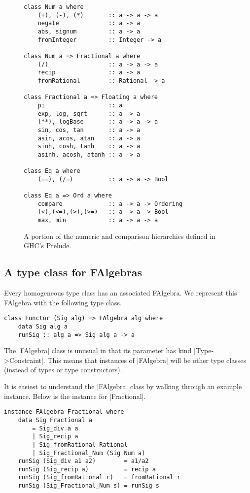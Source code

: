 \documentclass[preprint]{sigplanconf}
\theoremstyle{definition}
\begin{document}
\begin{figure}
\begin{lstlisting}
class Num a where
    (+), (-), (*)       :: a -> a -> a
    negate              :: a -> a
    abs, signum         :: a -> a
    fromInteger         :: Integer -> a

class Num a => Fractional a where
    (/)                 :: a -> a -> a
    recip               :: a -> a
    fromRational        :: Rational -> a

class Fractional a => Floating a where
    pi                  :: a
    exp, log, sqrt      :: a -> a
    (**), logBase       :: a -> a -> a
    sin, cos, tan       :: a -> a
    asin, acos, atan    :: a -> a
    sinh, cosh, tanh    :: a -> a
    asinh, acosh, atanh :: a -> a

class Eq a where
    (==), (/=)          :: a -> a -> Bool

class Eq a => Ord a where
    compare             :: a -> a -> Ordering
    (<),(<=),(>),(>=)   :: a -> a -> Bool
    max, min            :: a -> a -> a
\end{lstlisting}
\caption{
    A portion of the numeric and comparison hierarchies defined in GHC's Prelude.
}
\label{code:ghc}
\end{figure}


\subsection{A type class for FAlgebras}
Every homogeneous type class has an associated FAlgebra.
We represent this FAlgebra with the following type class.
\begin{lstlisting}
class Functor (Sig alg) => FAlgebra alg where
    data Sig alg a
    runSig :: alg a => Sig alg a -> a
\end{lstlisting}
The |FAlgebra| class is unusual in that its parameter has kind |Type->Constraint|.
This means that instances of |FAlgebra| will be other type classes
(instead of types or type constructors).

It is easiest to understand the |FAlgebra| class by walking through an example instance.
Below is the instance for |Fractional|.
\begin{lstlisting}
instance FAlgebra Fractional where
    data Sig Fractional a
        = Sig_div a a
        | Sig_recip a
        | Sig_fromRational Rational
        | Sig_Fractional_Num (Sig Num a)
    runSig (Sig_div a1 a2)        = a1/a2
    runSig (Sig_recip a)          = recip a
    runSig (Sig_fromRational r)   = fromRational r
    runSig (Sig_Fractional_Num s) = runSig s
\end{lstlisting}
\end{document}
